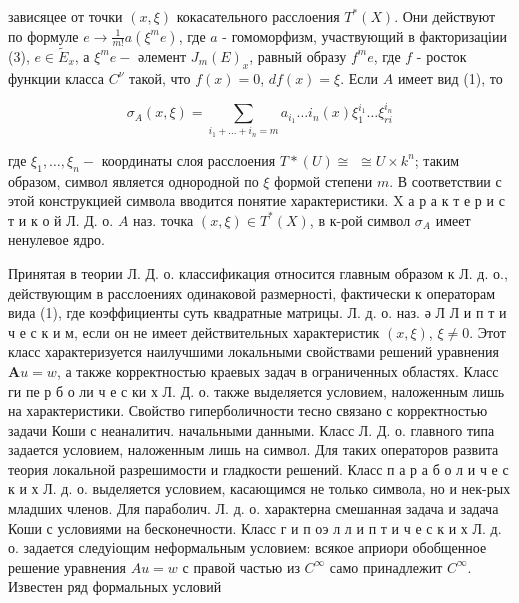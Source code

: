\documentclass[10pt]{article}
\begin{document}
зависяцее от точки $(x, \xi)$ кокасательного расслоения $T^{*}(X)$. Они действуют по формуле $e \rightarrow \frac{1}{m !} a\left(\xi^{m} e\right)$, где $a$ - гомоморфизм, участвующий в факторизаціии (3), $e \in \tilde{E}_{x}$, а $\xi^{m} e-$ әлемент $J_{m}(E)_{x}$, равный образу $f^{m} e$, где $f$ - росток функции класса $C^{\nu}$ такой, что $f(x)=0$, $d f(x)=\xi$. Если $A$ имеет вид (1), то



\[

\sigma_{A}(x, \xi)=\sum_{i_{1}+\ldots+i_{n}=m} a_{i_{1}} \ldots i_{n}(x) \xi_{1}^{i_{1}} \ldots \xi_{r i}^{i_{n}}

\]



где $\xi_{1}, \ldots, \xi_{n}-$ координаты слоя расслоения $T *(U) \cong$ $\cong U \times k^{n}$; таким образом, символ является однородной по $\xi$ формой степени $m$. В соответствии с этой конструкцией символа вводится понятие характеристики. $\mathrm{X}$ а р а к т е р и с т и к о й Л. Д. о. $A$ наз. точка $(x, \xi) \in T^{*}(X)$, в к-рой символ $\sigma_{A}$ имеет ненулевое ядро.



Принятая в теории Л. Д. о. классификация относится главным образом к Л. д. о., действующим в расслоениях одинаковой размерності, фактически к операторам вида (1), где коэффициенты суть квадратные матрицы. Л. д. о. наз. ә Л Л и п т и ч е с к и м, если он не имеет действительных характеристик $(x, \xi)$, $\xi \neq 0$. Этот класс характеризуется наилучшими локальными свойствами решений уравнения $\boldsymbol{A} u=w$, а также корректностью краевых задач в ограниченных областях. Класс ги пе р б о ли ч е с ки х Л. Д. о. также выделяется условием, наложенным лишь на характеристики. Свойство гиперболичности тесно связано с корректностью задачи Коши с неаналитич. начальными данными. Класс Л. Д. о. главного типа задается условием, наложенным лишь на символ. Для таких операторов развита теория локальной разрешимости и гладкости решений. Класс п а р а б о л и ч е с к и х Л. д. о. выделяется условием, касающимся не только символа, но и нек-рых младших членов. Для параболич. Л. д. о. характерна смешанная задача и задача Коши с условиями на бесконечности. Класс г и п оэ л л и п т и ч е с к и х Л. д. о. задается следуіощим неформальным условием: всякое априори обобщенное решение уравнения $A u=w$ с правой частью из $C^{\infty}$ само принадлежит $C^{\infty}$. Известен ряд формальных условий
\end{document}
